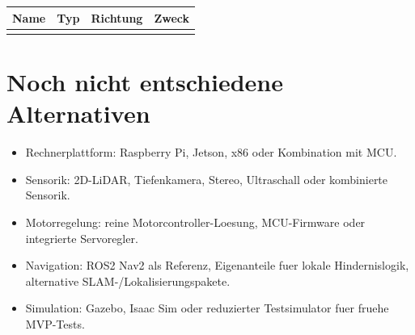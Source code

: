 \begin{longtable}{L{0.18\textwidth} L{0.20\textwidth} L{0.16\textwidth} L{0.30\textwidth}}
\toprule
Name & Typ & Richtung & Zweck \\
\midrule
{}
\bottomrule
\end{longtable}

\section{Noch nicht entschiedene Alternativen}

\begin{itemize}
  \item Rechnerplattform: Raspberry Pi, Jetson, x86 oder Kombination mit MCU.
  \item Sensorik: 2D-LiDAR, Tiefenkamera, Stereo, Ultraschall oder kombinierte Sensorik.
  \item Motorregelung: reine Motorcontroller-Loesung, MCU-Firmware oder integrierte Servoregler.
  \item Navigation: ROS2 Nav2 als Referenz, Eigenanteile fuer lokale Hindernislogik, alternative SLAM-/Lokalisierungspakete.
  \item Simulation: Gazebo, Isaac Sim oder reduzierter Testsimulator fuer fruehe MVP-Tests.
\end{itemize}
